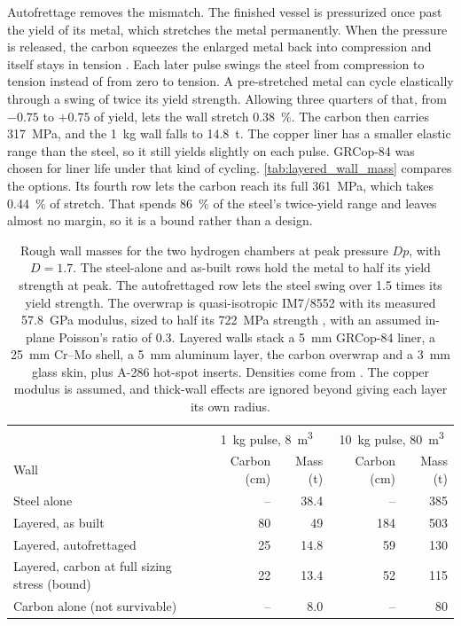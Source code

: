 \documentclass{article}
\begin{document}
Autofrettage removes the mismatch. The finished vessel is pressurized once past the yield of its metal, which stretches the metal permanently. When the pressure is released, the carbon squeezes the enlarged metal back into compression and itself stays in tension \cite{mclaughlan2011_copv_primer}. Each later pulse swings the steel from compression to tension instead of from zero to tension. A pre-stretched metal can cycle elastically through a swing of twice its yield strength. Allowing three quarters of that, from $-0.75$ to $+0.75$ of yield, lets the wall stretch \SI{0.38}{\percent}. The carbon then carries \SI{317}{\mega\pascal}, and the \SI{1}{\kilogram} wall falls to \SI{14.8}{\tonne}. The copper liner has a smaller elastic range than the steel, so it still yields slightly on each pulse. GRCop-84 was chosen for liner life under that kind of cycling. \autoref{tab:layered_wall_mass} compares the options. Its fourth row lets the carbon reach its full \SI{361}{\mega\pascal}, which takes \SI{0.44}{\percent} of stretch. That spends \SI{86}{\percent} of the steel's twice-yield range and leaves almost no margin, so it is a bound rather than a design.

\begin{table}[!htpb]
    \centering
    \caption{Rough wall masses for the two hydrogen chambers at peak pressure $Dp$, with $D=1.7$. The steel-alone and as-built rows hold the metal to half its yield strength at peak. The autofrettaged row lets the steel swing over 1.5 times its yield strength. The overwrap is quasi-isotropic IM7/8552 with its measured \SI{57.8}{\giga\pascal} modulus, sized to half its \SI{722}{\mega\pascal} strength \cite{ncamp2019_im7_8552}, with an assumed in-plane Poisson's ratio of 0.3. Layered walls stack a \SI{5}{\milli\meter} GRCop-84 liner, a \SI{25}{\milli\meter} Cr--Mo shell, a \SI{5}{\milli\meter} aluminum layer, the carbon overwrap and a \SI{3}{\milli\meter} glass skin, plus A-286 hot-spot inserts. Densities come from \cite{mil_hdbk_5j,alexander2012_cfrp_planar_impact,ellis2002_grcop84_handbook,crc_handbook,accurate_acculam_g10}. The copper modulus is assumed, and thick-wall effects are ignored beyond giving each layer its own radius.}
    \label{tab:layered_wall_mass}
    \begin{tabular}{lrrrr}
        \hline
         & \multicolumn{2}{c}{\SI{1}{\kilogram} pulse, \SI{8}{\cubic\meter}} & \multicolumn{2}{c}{\SI{10}{\kilogram} pulse, \SI{80}{\cubic\meter}} \\
        Wall & Carbon (cm) & Mass (t) & Carbon (cm) & Mass (t) \\
        \hline
        Steel alone & -- & 38.4 & -- & 385 \\
        Layered, as built & 80 & 49 & 184 & 503 \\
        Layered, autofrettaged & 25 & 14.8 & 59 & 130 \\
        Layered, carbon at full sizing stress (bound) & 22 & 13.4 & 52 & 115 \\
        Carbon alone (not survivable) & -- & 8.0 & -- & 80 \\
        \hline
    \end{tabular}
\end{table}
\end{document}
